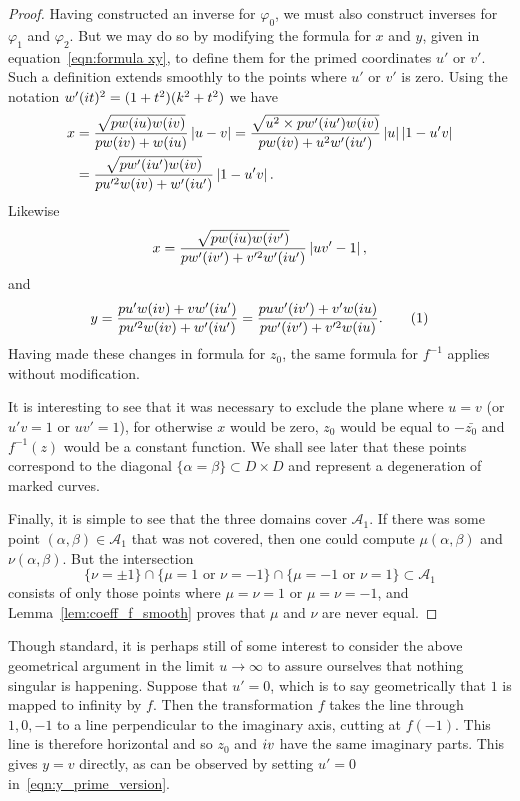 \begin{lem}
\begin{proof}
Having constructed an inverse for $φ_0$, we must also construct inverses for $φ_1$ and $φ_2$. But we may do so by modifying the formula for $x$ and $y$, given in equation~\eqref{eqn:formula xy}, to define them for the primed coordinates $u'$ or $v'$. Such a definition extends smoothly to the points where $u'$ or $v'$ is zero. Using the notation $w'(i t)^2 = (1+t^2)(k^2 + t^2)$ we have
\begin{align*}
x
&= \frac{\sqrt{pw(i u)w(i v)}}{pw(i v) + w(i u)} \left|u-v\right|
= \frac{\sqrt{u^2 \times pw'(i u')w(i v)}}{pw(i v) + u^2 w'(i u')} \left|u\right|\left|1-u'v\right| \\
&= \frac{\sqrt{pw'(i u')w(i v)}}{pu'^2w(i v) + w'(i u')} \left|1-u'v\right|.
\end{align*}
Likewise
\[
x
= \frac{\sqrt{pw(i u)w(i v')}}{pw'(i v') + v'^2w'(i u')} \left|uv'-1\right|,
\]
and
\[
y
= \frac{pu'w(\iu v) + vw'(\iu u')}{pu'^2w(\iu v) + w'(\iu u')}
= \frac{puw'(\iu v') + v'w(\iu u)}{pw'(\iu v') + v'^2w(\iu u)}. \labelthis{eqn:y_prime_version}
\]
Having made these changes in formula for $z_0$, the same formula for $f^{-1}$ applies without modification.

It is interesting to see that it was necessary to exclude the plane where $u=v$ (or $u'v=1$ or $uv'=1$), for otherwise $x$ would be zero, $z_0$ would be equal to $-\bar{z_0}$ and $f^{-1}(z)$ would be a constant function. We shall see later that these points correspond to the diagonal $\{α=β\} \subset D\times D$ and represent a degeneration of marked curves.

Finally, it is simple to see that the three domains cover $\mathcal{A}_1$. If there was some point $(α,β) \in \mathcal{A}_1$ that was not covered, then one could compute $μ(α,β)$ and $ν(α,β)$. But the intersection
\[
\{ν = \pm 1\}
\cap \{μ = 1 \text{ or } ν = -1 \}
\cap \{μ = -1 \text{ or } ν = 1 \} \subset \mathcal{A}_1
\]
consists of only those points where $μ=ν=1$ or $μ=ν=-1$, and Lemma~\ref{lem:coeff_f_smooth} proves that $μ$ and $ν$ are never equal.
\end{proof}
\end{lem}

Though standard, it is perhaps still of some interest to consider the above geometrical argument in the limit $u\to\infty$ to assure ourselves that nothing singular is happening. Suppose that $u' = 0$, which is to say geometrically that $1$ is mapped to infinity by $f$. Then the transformation $f$ takes the line through $1,0,-1$ to a line perpendicular to the imaginary axis, cutting at $f(-1)$. This line is therefore horizontal and so $z_0$ and $i v$ have the same imaginary parts. This gives $y=v$ directly, as can be observed by setting $u'=0$ in~\eqref{eqn:y_prime_version}.

